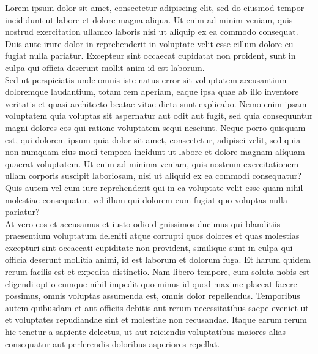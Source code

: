 Lorem ipsum dolor sit amet, consectetur adipiscing elit, sed do eiusmod tempor incididunt ut labore et dolore magna aliqua. 
Ut enim ad minim veniam, quis nostrud exercitation ullamco laboris nisi ut aliquip ex ea commodo consequat. 
Duis aute irure dolor in reprehenderit in voluptate velit esse cillum dolore eu fugiat nulla pariatur. 
Excepteur sint occaecat cupidatat non proident, sunt in culpa qui officia deserunt mollit anim id est laborum.
\\Sed ut perspiciatis unde omnis iste natus error sit voluptatem accusantium doloremque laudantium, totam rem aperiam, 
eaque ipsa quae ab illo inventore veritatis et quasi architecto beatae vitae dicta sunt explicabo. 
Nemo enim ipsam voluptatem quia voluptas sit aspernatur aut odit aut fugit, sed quia consequuntur magni 
dolores eos qui ratione voluptatem sequi nesciunt. Neque porro quisquam est, qui dolorem ipsum quia dolor sit amet, 
consectetur, adipisci velit, sed quia non numquam eius modi tempora incidunt ut labore et dolore magnam aliquam quaerat voluptatem. 
Ut enim ad minima veniam, quis nostrum exercitationem ullam corporis suscipit laboriosam, nisi ut aliquid ex ea commodi consequatur? 
Quis autem vel eum iure reprehenderit qui in ea voluptate velit esse quam nihil molestiae consequatur, 
vel illum qui dolorem eum fugiat quo voluptas nulla pariatur?
\\At vero eos et accusamus et iusto odio dignissimos ducimus qui blanditiis praesentium voluptatum deleniti atque corrupti 
quos dolores et quas molestias excepturi sint occaecati cupiditate non provident, similique sunt in culpa qui officia 
deserunt mollitia animi, id est laborum et dolorum fuga. Et harum quidem rerum facilis est et expedita distinctio. 
Nam libero tempore, cum soluta nobis est eligendi optio cumque nihil impedit quo minus id quod maxime placeat facere possimus, 
omnis voluptas assumenda est, omnis dolor repellendus. Temporibus autem quibusdam et aut officiis debitis aut rerum 
necessitatibus saepe eveniet ut et voluptates repudiandae sint et molestiae non recusandae. 
Itaque earum rerum hic tenetur a sapiente delectus, ut aut reiciendis voluptatibus maiores alias consequatur aut perferendis 
doloribus asperiores repellat.
